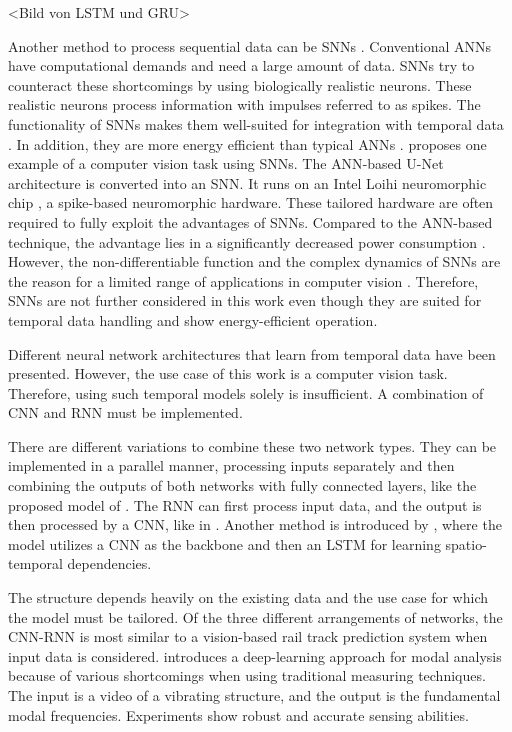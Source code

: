 <Bild von LSTM und GRU>

Another method to process sequential data can be \ac{SNN}s \cite{spikingNeuralNetworksReview2022}.
Conventional \ac{ANN}s have computational demands and need a large amount of data.
\ac{SNN}s try to counteract these shortcomings by using biologically realistic neurons.
These realistic neurons process information with impulses referred to as spikes.
The functionality of \ac{SNN}s makes them well-suited for integration with temporal data \cite{spikingNeuralNetworksReview2022}.
In addition, they are more energy efficient than typical \ac{ANN}s \cite{spikingNeuralNetworks2019}.
\cite{uNetAsSNN2021} proposes one example of a computer vision task using \ac{SNN}s.
The \ac{ANN}-based U-Net architecture is converted into an \ac{SNN}.
It runs on an Intel Loihi neuromorphic chip \cite{Loihi2018}, a spike-based neuromorphic hardware.
These tailored hardware are often required to fully exploit the advantages of \ac{SNN}s.
Compared to the \ac{ANN}-based technique, the advantage lies in a significantly decreased power consumption \cite{uNetAsSNN2021}.
However, the non-differentiable function and the complex dynamics of \ac{SNN}s are the reason for a limited range of applications in computer vision \cite{spikingNeuralNetworksReview2022} \cite{spikingNeuralNetworks2019}.
Therefore, \ac{SNN}s are not further considered in this work even though they are suited for temporal data handling and show energy-efficient operation.

Different neural network architectures that learn from temporal data have been presented.
However, the use case of this work is a computer vision task.
Therefore, using such temporal models solely is insufficient.
A combination of \ac{CNN} and \ac{RNN} must be implemented.

There are different variations to combine these two network types.
They can be implemented in a parallel manner, processing inputs separately and then combining the outputs of both networks with fully connected layers, like the proposed model of \cite{CNNLSTMparallel2021}.
The \ac{RNN} can first process input data, and the output is then processed by a \ac{CNN}, like in \cite{LSTMCNN2022}.
Another method is introduced by \cite{CNNLSTM2020}, where the model utilizes a \ac{CNN} as the backbone and then an \ac{LSTM} for learning spatio-temporal dependencies.

The structure depends heavily on the existing data and the use case for which the model must be tailored.
Of the three different arrangements of networks, the \ac{CNN}-\ac{RNN} \cite{CNNLSTM2020} is most similar to a vision-based rail track prediction system when input data is considered.
\cite{CNNLSTM2020} introduces a deep-learning approach for modal analysis because of various shortcomings when using traditional measuring techniques.
The input is a video of a vibrating structure, and the output is the fundamental modal frequencies.
Experiments show robust and accurate sensing abilities.

